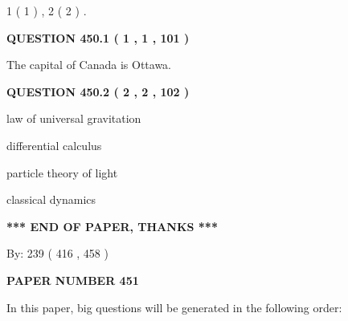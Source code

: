 \documentclass[12pt]{article}
\begin{document}
   
   1 ( 1 )
 ,
   2 ( 2 )
 .
  
\vspace{0.2in}
  
{\textbf{\Large{QUESTION
450.1 
 ( 1 , 1 , 101 )
}}}
  
  
 
 
\noindent{}
 
 
The capital of Canada is Ottawa.
 
 
 
 
  
\vspace{0.2in}
  
{\textbf{\Large{QUESTION
450.2 
 ( 2 , 2 , 102 )
}}}
  
  
 
 
\noindent{}
 
 
law of universal gravitation
 
 
differential calculus
 
 
particle theory of light
 
 
classical dynamics
 
 
 
 
   
   
\vspace{1.0in} 
{\textbf{\large{ *** END OF PAPER, THANKS *** }}} 
   
   
\hspace{1.0in} By: 
 239 ( 416 ,  458 )
   
   
   
   
\newpage 
\setcounter{page}{ 
   451001 } 
   
   
   
   
 {\textbf{ \Large{ PAPER NUMBER  451  }}}
   
   
\vspace{0.2in}
   
   
   
   
   
\vspace{0.2in}
   
In this paper, big questions will be generated in the following order: 
   
\end{document}
